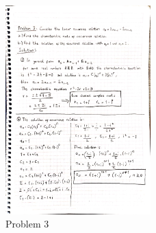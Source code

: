 \documentclass[a4 paper]{article}
\numberwithin{equation}{section}
\newcommand{\0}{\mathbf{0}}
\begin{document}
\begin{figure}[!b]
	\centering
	\includegraphics[width=0.5\textwidth]{problem3.jpg}
	\caption{Problem 3}
\end{figure} 
\end{document}
